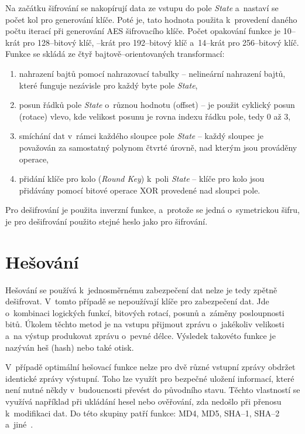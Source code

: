 Na začátku šifrování se nakopírují data ze vstupu do pole {\it State} a~nastaví se počet kol pro
generování klíče. Poté je, tato hodnota použita k~provedení daného počtu iterací při generování AES
šifrovacího klíče. Počet opakování funkce je 10--krát pro 128--bitový klíč, --krát
pro 192--bitový klíč a~14--krát pro 256--bitový klíč. Funkce se skládá ze čtyř
bajtově--orientovaných transformací:
    \begin{enumerate}
    \item nahrazení bajtů pomocí nahrazovací tabulky -- nelineární nahrazení bajtů, které funguje
        nezávisle pro každý byte pole {\it State},
    \item posun řádků pole {\it State} o~různou hodnotu (offset) -- je použit cyklický posun
        (rotace) vlevo, kde velikost posunu je rovna indexu řádku pole, tedy 0 až 3,
    \item smíchání dat v~rámci každého sloupce pole {\it State} -- každý sloupec je považován za
        samostatný polynom čtvrté úrovně, nad kterým jsou prováděny operace,
    \item přidání klíče pro kolo ({\it Round Key}) k~poli {\it State} -- klíče pro kolo jsou
	přidávány pomocí bitové operace XOR provedené nad sloupci pole.
\end{enumerate}
Pro dešifrování je použita inverzní funkce, a~protože se jedná o~symetrickou šifru, je pro dešifrování
použito stejné heslo jako pro šifrování.

\section{Hešování}
Hešování se používá k~jednosměrnému zabezpečení dat nelze je tedy zpětně dešifrovat. V~tomto případě
se nepoužívají klíče pro zabezpečení dat. Jde o~kombinaci logických funkcí, bitových rotací, posunů
a~záměny posloupnosti bitů. Úkolem těchto metod je na vstupu přijmout zprávu o~jakékoliv velikosti
a~na výstup produkovat zprávu o~pevné délce. Výsledek takovéto funkce je nazýván heš (hash) nebo
také otisk. 

 V~případě optimální hešovací funkce nelze pro dvě různé vstupní zprávy obdržet identické zprávy
výstupní. Toho lze využít pro bezpečné uložení informací, které není nutné někdy v~budoucnosti
převést do původního stavu. Těchto vlastností se využívá například při ukládání hesel nebo
ověřování, zda nedošlo při přenosu k~modifikaci dat. Do této skupiny patří funkce: MD4, MD5, SHA--1,
SHA--2 a~jiné~\cite{AC:1996}.


